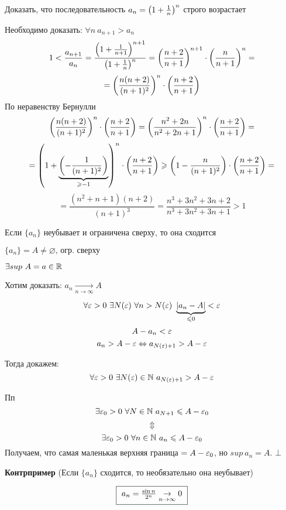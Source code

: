 \begin{example}
    Доказать, что последовательность $a_n = \left(1 + \frac{1}{n}\right)^n$ строго возрастает

    Необходимо доказать: $\forall n\ a_{n+1} > a_n$
    $$1 < \frac{a_{n+1}}{a_n} = \frac{\left(1 + \frac{1}{n+1}\right)^{n+1}}{\left(1 + \frac{1}{n}\right)^n} = \left(\frac{n+2}{n+1}\right)^{n+1} \cdot \left(\frac{n}{n+1}\right)^n =$$
    $$ = \left(\frac{n(n+2)}{(n+1)^2}\right)^n \cdot \left(\frac{n+2}{n+1}\right) $$
    По неравенству Бернулли 
    $$ \left(\frac{n(n+2)}{(n+1)^2}\right)^n \cdot \left(\frac{n+2}{n+1}\right) = \left(\frac{n^2 + 2n}{n^2 + 2n + 1}\right)^n \cdot \left(\frac{n+2}{n+1}\right) = $$
    $$ = \left(1 + \underbrace{\left(- \frac{1}{(n + 1)^2}\right)}_{\geqslant -1}\right)^n \cdot \left(\frac{n+2}{n+1}\right) \geqslant \left(1 - \frac{n}{(n + 1)^2}\right) \cdot \left(\frac{n+2}{n+1}\right) = $$
    $$ = \frac{(n^2 + n + 1)(n + 2)}{(n+1)^3} = \frac{n^3 + 3n^2 + 3n + 2}{n^3 + 3n^2 + 3n + 1} > 1 $$
\end{example}

\begin{theorem}
    Если $\{a_n\}$ неубывает и ограничена сверху, то она сходится
\end{theorem}

\begin{Proof}
    $ \{a_n\} = A \neq \varnothing \text{, огр. сверху} $

    $ \exists sup\ A = a \in \mathbb{R} $

    Хотим доказать: $a_n \underset{n \to \infty}{\to} A $

    $$ \forall \eps > 0\ \exists N(\eps)\ \forall n > N(\eps)\ \underbrace{|a_n - A|}_{\leq 0} < \eps $$
    $$ A - a_n < \varepsilon $$
    $$ a_n > A - \varepsilon \Leftrightarrow a_{N(\varepsilon) + 1} > A - \varepsilon$$

    Тогда докажем:
    $$ \forall \eps > 0\ \exists N(\eps) \in \N\ a_{N(\eps) + 1} > A - \eps $$

    Пп 
    $$ \exists \varepsilon_0 > 0\ \forall N \in \mathbb{N}\ a_{N+1} \leqslant A - \varepsilon_0 $$
    $$ \Updownarrow $$
    $$ \exists \eps_0 > 0\ \forall n \in \N\ a_{n} \leq A - \eps_0 $$
    Получаем, что самая маленькая верхняя граница $ = A - \varepsilon_0 $, но $ sup\ a_n = A$. $\bot$
\end{Proof}

\textbf{Контрпример} (Если $\{a_n\}$ сходится, то необязательно она неубывает)

$$ \fbox{
    $ a_n = \frac{\sin n}{2^n} \underset{n \rightarrow \infty}{\rightarrow} 0 $
} $$

